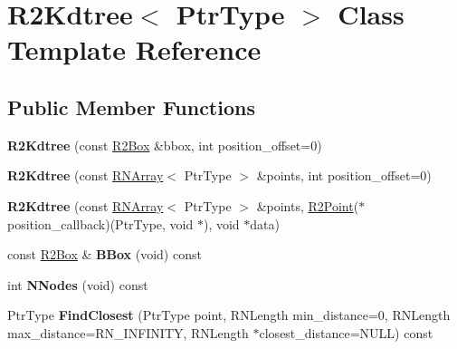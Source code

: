 \hypertarget{class_r2_kdtree}{}\section{R2\+Kdtree$<$ Ptr\+Type $>$ Class Template Reference}
\label{class_r2_kdtree}
\subsection*{Public Member Functions}
\begin{DoxyCompactItemize}
\item 
{\bfseries R2\+Kdtree} (const \hyperlink{class_r2_box}{R2\+Box} \&bbox, int position\+\_\+offset=0)\hypertarget{class_r2_kdtree_a7f83dc65ef5b04990df88e554b6a7408}{}\label{class_r2_kdtree_a7f83dc65ef5b04990df88e554b6a7408}

\item 
{\bfseries R2\+Kdtree} (const \hyperlink{class_r_n_array}{R\+N\+Array}$<$ Ptr\+Type $>$ \&points, int position\+\_\+offset=0)\hypertarget{class_r2_kdtree_a708bc38f8ded972dc50df301fb04f0d0}{}\label{class_r2_kdtree_a708bc38f8ded972dc50df301fb04f0d0}

\item 
{\bfseries R2\+Kdtree} (const \hyperlink{class_r_n_array}{R\+N\+Array}$<$ Ptr\+Type $>$ \&points, \hyperlink{class_r2_point}{R2\+Point}($\ast$position\+\_\+callback)(Ptr\+Type, void $\ast$), void $\ast$data)\hypertarget{class_r2_kdtree_aa4965307de9467d5a6aa85dff4ca3e9c}{}\label{class_r2_kdtree_aa4965307de9467d5a6aa85dff4ca3e9c}

\item 
const \hyperlink{class_r2_box}{R2\+Box} \& {\bfseries B\+Box} (void) const \hypertarget{class_r2_kdtree_a1841f119098e3f99a23bbaa1d7253539}{}\label{class_r2_kdtree_a1841f119098e3f99a23bbaa1d7253539}

\item 
int {\bfseries N\+Nodes} (void) const \hypertarget{class_r2_kdtree_a985ee4597c93230bfabbd6a549786742}{}\label{class_r2_kdtree_a985ee4597c93230bfabbd6a549786742}

\item 
Ptr\+Type {\bfseries Find\+Closest} (Ptr\+Type point, R\+N\+Length min\+\_\+distance=0, R\+N\+Length max\+\_\+distance=R\+N\+\_\+\+I\+N\+F\+I\+N\+I\+TY, R\+N\+Length $\ast$closest\+\_\+distance=N\+U\+LL) const \hypertarget{class_r2_kdtree_ac3e51135c8e47ed3eda1d7c6aca2ed22}{}\label{class_r2_kdtree_ac3e51135c8e47ed3eda1d7c6aca2ed22}


\end{DoxyCompactItemize}
